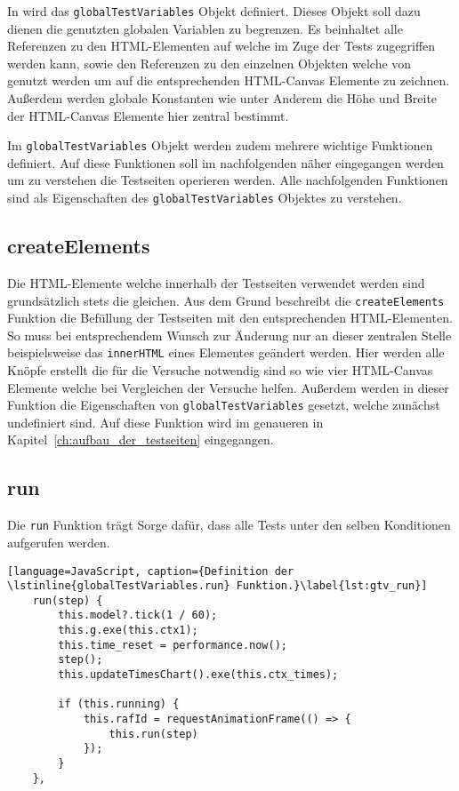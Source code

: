 In  wird das \lstinline{globalTestVariables} Objekt definiert.
Dieses Objekt soll dazu dienen die genutzten globalen Variablen zu begrenzen.
Es beinhaltet alle Referenzen zu den HTML-Elementen auf welche im Zuge der Tests zugegriffen werden kann, sowie den Referenzen zu den einzelnen  Objekten welche von  genutzt werden um auf die entsprechenden HTML-Canvas Elemente zu zeichnen.
Außerdem werden globale Konstanten wie unter Anderem die Höhe und Breite der HTML-Canvas Elemente hier zentral bestimmt.

Im \lstinline{globalTestVariables} Objekt werden zudem mehrere wichtige Funktionen definiert.
Auf diese Funktionen soll im nachfolgenden näher eingegangen werden um zu verstehen die Testseiten operieren werden.
Alle nachfolgenden Funktionen sind als Eigenschaften des \lstinline{globalTestVariables} Objektes zu verstehen.

\subsection{createElements}\label{ch:gtv_createElements}

Die HTML-Elemente welche innerhalb der Testseiten verwendet werden sind grundsätzlich stets die gleichen.
Aus dem Grund beschreibt die \lstinline{createElements} Funktion die Befüllung der Testseiten mit den entsprechenden HTML-Elementen.
So muss bei entsprechendem Wunsch zur Änderung nur an dieser zentralen Stelle beispielsweise das \lstinline{innerHTML} eines Elementes geändert werden.
Hier werden alle Knöpfe erstellt die für die Versuche notwendig sind so wie vier HTML-Canvas Elemente welche bei Vergleichen der Versuche helfen.
Außerdem werden in dieser Funktion die Eigenschaften von \lstinline{globalTestVariables} gesetzt, welche zunächst undefiniert sind.
Auf diese Funktion wird im genaueren in Kapitel~\ref{ch:aufbau_der_testseiten} eingegangen.

\subsection{run}\label{ch:gtv_run}

Die \lstinline{run} Funktion trägt Sorge dafür, dass alle Tests unter den selben Konditionen aufgerufen werden.

\begin{lstlisting}[language=JavaScript, caption={Definition der \lstinline{globalTestVariables.run} Funktion.}\label{lst:gtv_run}]
    run(step) {
        this.model?.tick(1 / 60);
        this.g.exe(this.ctx1);
        this.time_reset = performance.now();
        step();
        this.updateTimesChart().exe(this.ctx_times);
    
        if (this.running) {
            this.rafId = requestAnimationFrame(() => {
                this.run(step)
            });
        }
    },
\end{lstlisting}

